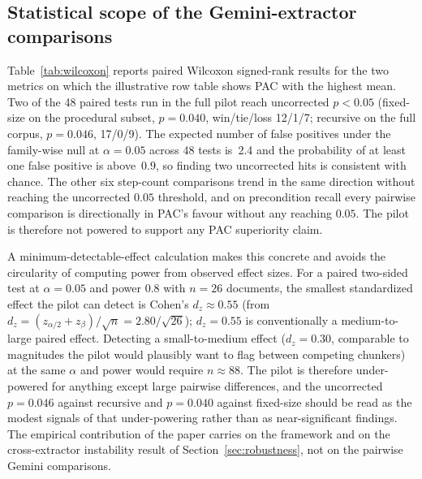 \documentclass[make,article,submit,oneauthor,pdftex]{Definitions/mdpi}
\begin{document}
\subsection{Statistical scope of the Gemini-extractor comparisons}\label{sec:stats-power}

Table~\ref{tab:wilcoxon} reports paired Wilcoxon signed-rank results
for the two metrics on which the illustrative row table shows PAC
with the highest mean. Two of the 48 paired tests run in the full
pilot reach uncorrected $p<0.05$ (fixed-size on the procedural
subset, $p=0.040$, win/tie/loss 12/1/7; recursive on the full corpus,
$p=0.046$, 17/0/9). The expected number of false positives under the
family-wise null at $\alpha=0.05$ across 48 tests is~2.4 and the
probability of at least one false positive is above~0.9, so finding
two uncorrected hits is consistent with chance. The other six
step-count comparisons trend in the same direction without reaching
the uncorrected $0.05$ threshold, and on precondition recall every
pairwise comparison is directionally in PAC's favour without any
reaching $0.05$. The pilot is therefore not powered to support any
PAC superiority claim.

A minimum-detectable-effect calculation makes this concrete and
avoids the circularity of computing power from observed effect sizes.
For a paired two-sided test at $\alpha=0.05$ and power 0.8 with
$n=26$ documents, the smallest standardized effect the pilot can
detect is Cohen's $d_z\approx0.55$ (from
$d_z=(z_{\alpha/2}+z_{\beta})/\sqrt{n}=2.80/\sqrt{26}$); $d_z=0.55$
is conventionally a medium-to-large paired effect. Detecting a
small-to-medium effect ($d_z=0.30$, comparable to magnitudes the
pilot would plausibly want to flag between competing chunkers) at the
same $\alpha$ and power would require $n\approx88$. The pilot is
therefore under-powered for anything except large pairwise
differences, and the uncorrected $p=0.046$ against recursive and
$p=0.040$ against fixed-size should be read as the modest signals of
that under-powering rather than as near-significant findings. The
empirical contribution of the paper carries on the framework and on
the cross-extractor instability result of
Section~\ref{sec:robustness}, not on the pairwise Gemini
comparisons.
\end{document}
